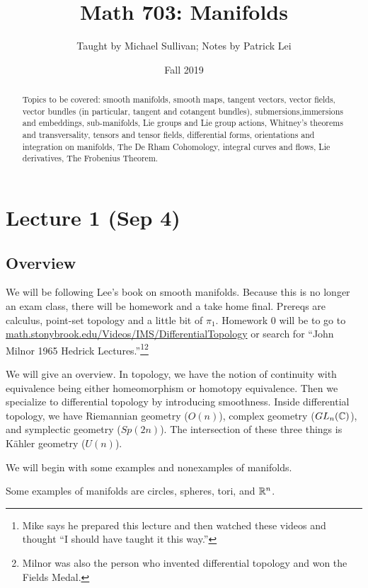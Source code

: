 \documentclass[twoside, 10pt]{article}
\title{Math 703: Manifolds}
\author{Taught by Michael Sullivan; Notes by Patrick Lei}
\affil{University of Massachusetts, Amherst}
\date{Fall 2019}
\begin{document}
    \maketitle\thispagestyle{firstpage}
    
    \begin{abstract}
        Topics to be covered: smooth manifolds, smooth maps, tangent vectors,
    vector fields, vector bundles (in particular, tangent and cotangent
bundles), submersions,immersions and embeddings, sub-manifolds, Lie groups and
Lie group actions, Whitney's theorems and transversality, tensors and tensor
fields, differential forms, orientations and integration on manifolds, The De
Rham Cohomology, integral curves and flows, Lie derivatives, The Frobenius
Theorem.  \end{abstract}

    \tableofcontents

    \section{Lecture 1 (Sep 4)}%

    \subsection{Overview}%
    
    
    We will be following Lee's book on smooth manifolds. Because this is no
    longer an exam class, there will be homework and a take home final. Prereqs
    are calculus, point-set topology and a little bit of $\pi_1$. Homework $0$
    will be to go to \url{math.stonybrook.edu/Videos/IMS/DifferentialTopology}
    or search for ``John Milnor 1965 Hedrick Lectures.''\footnote{Mike says he
    prepared this lecture and then watched these videos and thought ``I should
have taught it this way.''}\footnote{Milnor was also the person who invented
differential topology and won the Fields Medal.}

    
    We will give an overview. In topology, we have the notion of continuity
    with equivalence being either homeomorphism or homotopy equivalence. Then
    we specialize to differential topology by introducing smoothness. Inside
    differential topology, we have Riemannian geometry ($O(n)$), complex
    geometry ($GL_n(\mathbb{C})$), and symplectic geometry ($Sp(2n)$). The intersection
    of these three things is K\"ahler geometry ($U(n)$).

    We will begin with some examples and nonexamples of manifolds.  \begin{exm}
    Some examples of manifolds are circles, spheres, tori, and $\mathbb{R}^n$.
\end{exm}
\end{document}
